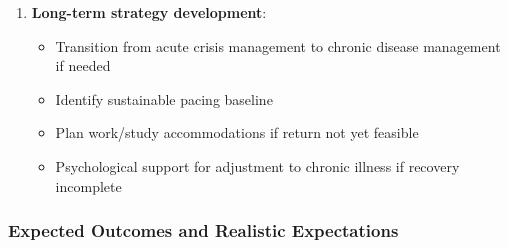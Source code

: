 \begin{protocol}
\begin{enumerate}
    \item \textbf{Long-term strategy development}:
    \begin{itemize}
        \item Transition from acute crisis management to chronic disease management if needed
        \item Identify sustainable pacing baseline
        \item Plan work/study accommodations if return not yet feasible
        \item Psychological support for adjustment to chronic illness if recovery incomplete
    \end{itemize}
\end{enumerate}

\end{protocol}

\subsubsection{Expected Outcomes and Realistic Expectations}

